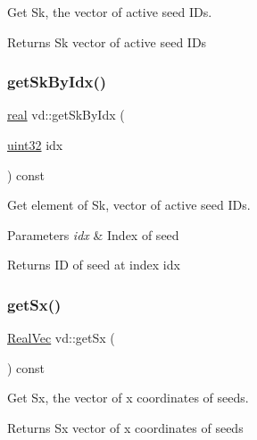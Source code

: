 Get Sk, the vector of active seed I\+Ds. 

\begin{DoxyReturn}{Returns}
Sk vector of active seed I\+Ds 
\end{DoxyReturn}
\mbox{\label{classvd_a4d2c835e7804c4242dce6d411f01ce0a}} 
\subsubsection{\texorpdfstring{get\+Sk\+By\+Idx()}{getSkByIdx()}}
{\footnotesize\ttfamily \mbox{\hyperlink{typedefs_8h_a58a0c7cf2501f4492da833421be92547}{real}} vd\+::get\+Sk\+By\+Idx (\begin{DoxyParamCaption}\item[{\mbox{\hyperlink{typedefs_8h_a8ad23e2333787a214e20a58a284a5a60}{uint32}}}]{idx }\end{DoxyParamCaption}) const}



Get element of Sk, vector of active seed I\+Ds. 


\begin{DoxyParams}{Parameters}
{\em idx} & Index of seed \\
\hline
\end{DoxyParams}
\begin{DoxyReturn}{Returns}
ID of seed at index idx 
\end{DoxyReturn}
\mbox{\label{classvd_a309203fb398a885176ae985a8906e886}} 
\subsubsection{\texorpdfstring{get\+Sx()}{getSx()}}
{\footnotesize\ttfamily \mbox{\hyperlink{typedefs_8h_a84b6d9a0fbb45e01ad4a3aa5667f2992}{Real\+Vec}} vd\+::get\+Sx (\begin{DoxyParamCaption}{ }\end{DoxyParamCaption}) const}



Get Sx, the vector of x coordinates of seeds. 

\begin{DoxyReturn}{Returns}
Sx vector of x coordinates of seeds 
\end{DoxyReturn}
\mbox{\label{classvd_a960d4b8fbedb7cbb0686ad42e19d6396}} 
